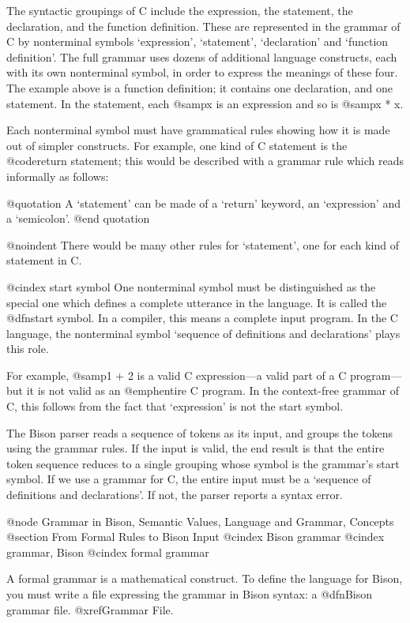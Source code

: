 The syntactic groupings of C include the expression, the statement, the
declaration, and the function definition.  These are represented in the
grammar of C by nonterminal symbols `expression', `statement',
`declaration' and `function definition'.  The full grammar uses dozens of
additional language constructs, each with its own nonterminal symbol, in
order to express the meanings of these four.  The example above is a
function definition; it contains one declaration, and one statement.  In
the statement, each @samp{x} is an expression and so is @samp{x * x}.

Each nonterminal symbol must have grammatical rules showing how it is made
out of simpler constructs.  For example, one kind of C statement is the
@code{return} statement; this would be described with a grammar rule which
reads informally as follows:

@quotation
A `statement' can be made of a `return' keyword, an `expression' and a
`semicolon'.
@end quotation

@noindent
There would be many other rules for `statement', one for each kind of
statement in C.

@cindex start symbol
One nonterminal symbol must be distinguished as the special one which
defines a complete utterance in the language.  It is called the @dfn{start
symbol}.  In a compiler, this means a complete input program.  In the C
language, the nonterminal symbol `sequence of definitions and declarations'
plays this role.

For example, @samp{1 + 2} is a valid C expression---a valid part of a C
program---but it is not valid as an @emph{entire} C program.  In the
context-free grammar of C, this follows from the fact that `expression' is
not the start symbol.

The Bison parser reads a sequence of tokens as its input, and groups the
tokens using the grammar rules.  If the input is valid, the end result is
that the entire token sequence reduces to a single grouping whose symbol is
the grammar's start symbol.  If we use a grammar for C, the entire input
must be a `sequence of definitions and declarations'.  If not, the parser
reports a syntax error.

@node Grammar in Bison, Semantic Values, Language and Grammar, Concepts
@section From Formal Rules to Bison Input
@cindex Bison grammar
@cindex grammar, Bison
@cindex formal grammar

A formal grammar is a mathematical construct.  To define the language
for Bison, you must write a file expressing the grammar in Bison syntax:
a @dfn{Bison grammar} file.  @xref{Grammar File}.

